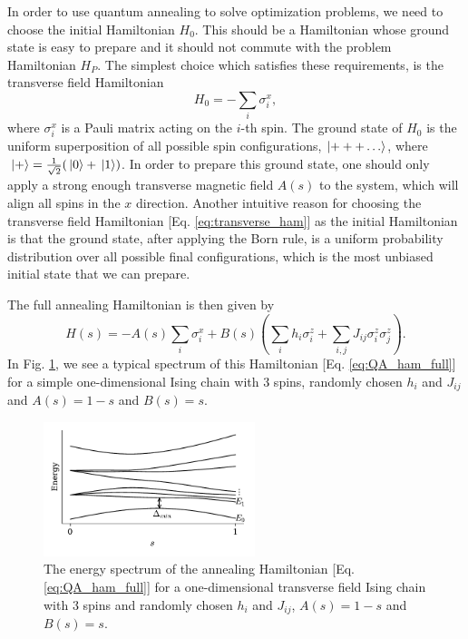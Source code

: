 \documentclass[12pt,a4paper]{article}
\begin{document}
\hspace*{0.3cm}
In order to use quantum annealing to solve optimization problems, we need to choose the initial Hamiltonian $H_0$.
This should be a Hamiltonian whose ground state is easy to prepare and it should not commute with
the problem Hamiltonian $H_P$. The simplest choice which satisfies these requirements, is the
transverse field Hamiltonian
\begin{equation}
    H_0 = - \sum_i \sigma^x_i,
    \label{eq:transverse_ham}
\end{equation}
where $\sigma^x_i$ is a Pauli matrix acting on the $i$-th spin. The ground state of $H_0$ is the uniform superposition
of all possible spin configurations, $\ket{+++\ldots}$, where $\ket*{+} = \frac{1}{\sqrt{2}}(\ket*{0} + \ket*{1})$.
In order to prepare this ground state, one should only apply a strong enough transverse magnetic field $A(s)$
to the system, which will align all spins in the $x$ direction. Another intuitive reason for choosing the transverse
field Hamiltonian [Eq. \eqref{eq:transverse_ham}] as the initial Hamiltonian is that the ground state, after applying
the Born rule, is a uniform probability distribution over all possible final configurations, which is the most
unbiased initial state that we can prepare.

\hspace*{0.3cm}
The full annealing Hamiltonian is then given by
\begin{equation}
    H(s) = - A(s) \sum_i \sigma^x_i + B(s) \left( \sum_i h_i \sigma^z_i + \sum_{i,j} J_{ij} \sigma^z_i \sigma^z_j \right).
    \label{eq:QA_ham_full}
\end{equation}
In Fig. \ref{fig:spectrum}, we see a typical spectrum of this Hamiltonian [Eq. \eqref{eq:QA_ham_full}]
for a simple one-dimensional Ising chain with 3 spins, randomly chosen $h_i$ and $J_{ij}$ and $A(s) = 1 - s$ and $B(s) = s$.
\begin{figure}[!htb]
    \centering
    \vspace*{-0.3cm}
    \includegraphics[width=0.55\textwidth]{../plots/ising_gap.pdf}
    \captionsetup{width=0.9\textwidth}
    \vspace*{-0.4cm}
    \caption{The energy spectrum of the annealing Hamiltonian [Eq. \eqref{eq:QA_ham_full}] for a
    one-dimensional transverse field Ising chain with 3 spins and randomly chosen $h_i$ and $J_{ij}$,
    $A(s) = 1 - s$ and $B(s) = s$.}
    \label{fig:spectrum}
\end{figure}
\end{document}

